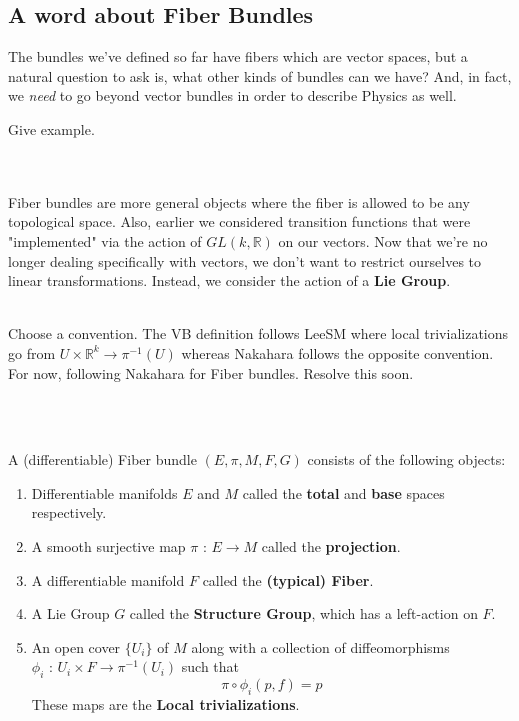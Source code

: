 \documentclass[11pt]{article}
\begin{document}
\subsection{A word about Fiber Bundles}
The bundles we've defined so far have fibers which are vector spaces, but a natural question to ask is, what other kinds of bundles can we have? And, in fact, we \emph{need} to go beyond vector bundles in order to describe Physics as well. \begin{note}
    {Give example.}
\end{note} 
\\
\\
Fiber bundles are more general objects where the fiber is allowed to be any topological space. Also, earlier we considered transition functions that were "implemented" via the action of $GL(k, \mathbb{R})$ on our vectors. Now that we're no longer dealing specifically with vectors, we don't want to restrict ourselves to linear transformations. Instead, we consider the action of a \textbf{Lie Group}.
\\
\\
\begin{note}
    {Choose a convention. The VB definition follows LeeSM where local trivializations go from $U \times \mathbb{R}^k \rightarrow \pi^{-1}(U)$ whereas Nakahara follows the opposite convention. For now, following Nakahara for Fiber bundles. Resolve this soon.}
\end{note}
\\
\\
\begin{definition}
    A (differentiable) Fiber bundle $(E, \pi, M, F, G)$ consists of the following objects:
    \begin{enumerate}
        \item Differentiable manifolds $E$ and $M$ called the \textbf{total} and \textbf{base} spaces respectively.
        \item A smooth surjective map $\pi \text{ : } E \rightarrow M$ called the \textbf{projection}.
        \item A differentiable manifold $F$ called the \textbf{(typical) Fiber}.
        \item A Lie Group $G$ called the \textbf{Structure Group}, which has a left-action on $F$.
        \item An open cover $\{U_{i}\}$ of $M$ along with a collection of diffeomorphisms $\phi_{i} \text{ : } U_i \times F \rightarrow \pi^{-1}(U_i)$ such that \[ \pi \circ \phi_i(p, f) = p \] These maps are the \textbf{Local trivializations}.
    \end{enumerate}
\end{definition}
\end{document}
